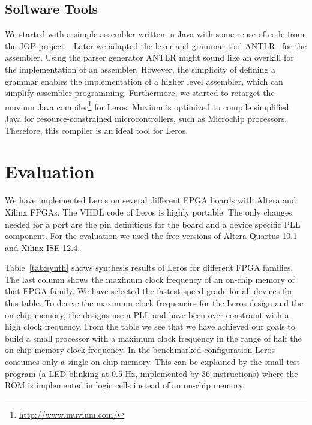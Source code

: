 \documentclass[a4paper,fontsize=10pt,twoside,DIV15,BCOR12mm,headinclude=true,footinclude=false,pagesize,bibtotoc]{scrbook}
\begin{document}
\subsection{Software Tools}

We started with a simple assembler written in Java with some reuse of code from the JOP project~\cite{jop:jnl:jsa2007}. Later we adapted the lexer and grammar tool ANTLR~\cite{antlr:1995} for the assembler. Using the parser generator ANTLR might sound like an overkill for the implementation of an assembler. However, the simplicity of defining a grammar enables the implementation of a  higher level assembler, which can simplify assembler programming. Furthermore, we started to retarget the muvium Java compiler\footnote{\url{http://www.muvium.com/}} for Leros. Muvium is optimized to compile simplified Java for resource-constrained microcontrollers, such as Microchip processors. Therefore, this compiler is an ideal tool for Leros.

\section{Evaluation}
\label{sec:eval}

We have implemented Leros on several different FPGA boards with Altera and Xilinx FPGAs. The VHDL code of Leros is highly portable. The only changes needed for a port are the pin definitions for the board and a device specific PLL component. For the evaluation we used the free versions of Altera Quartus 10.1 and Xilinx ISE 12.4.


Table~\ref{tab:synth} shows synthesis results of Leros for different FPGA families. The last column shows the maximum clock frequency of an on-chip memory of that FPGA family. We have selected the fastest speed grade for all devices for this table. To derive the maximum clock frequencies for the Leros design and the on-chip memory, the designs use a PLL and have been over-constraint with a high clock frequency.
From the table we see that we have achieved our goals to build a small processor with a maximum clock frequency in the range of half the on-chip memory clock frequency. In the benchmarked configuration Leros consumes only a single on-chip memory. This can be explained by the small test program (a LED blinking at 0.5 Hz, implemented by 36 instructions) where the ROM is implemented in logic cells instead of an on-chip memory.
\end{document}
